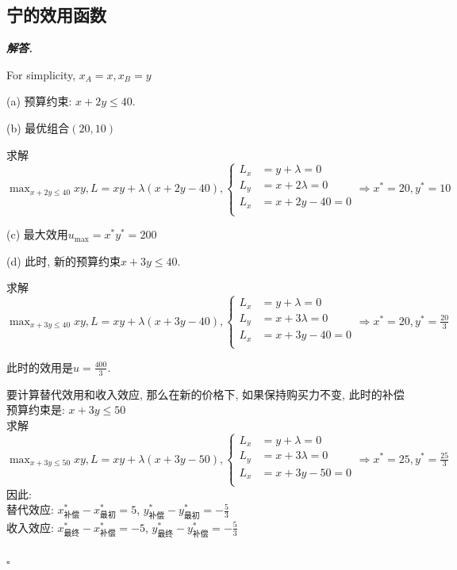 \documentclass[10pt, a4paper, oneside]{ctexart}
\newenvironment{solution}{%
  \par\noindent\textbf{\textit{解答. }}\ignorespaces
}{%
  \hfill\ensuremath{\square}\par %
}
\begin{document}
\subsection{宁的效用函数}
\begin{solution}
For simplicity, $x_A=x, x_B=y$

(a) 预算约束: $x+2y\leq 40$.

(b) 最优组合$(20,10)$

求解$\max_{x+2y\leq 40}xy, L=xy+\lambda(x+2y-40), \begin{cases}
    L_{x}&=y+\lambda=0\\
    L_{y}&=x+2\lambda=0\\
    L_{x}&=x+2y-40=0\\
\end{cases}\Rightarrow x^*=20,y^*=10$

(c) 最大效用$u_{\max}=x^*y^*=200$

(d) 此时, 新的预算约束$x+3y\leq 40$.

求解$\max_{x+3y\leq 40}xy, L=xy+\lambda(x+3y-40), \begin{cases}
    L_{x}&=y+\lambda=0\\
    L_{y}&=x+3\lambda=0\\
    L_{x}&=x+3y-40=0\\
\end{cases}\Rightarrow x^*=20,y^*=\frac{20}{3}$

此时的效用是$u=\frac{400}{3}$.

要计算替代效用和收入效应, 那么在新的价格下, 如果保持购买力不变, 此时的补偿预算约束是: $x+3y\leq 50$\\
求解$\max_{x+3y\leq 50}xy, L=xy+\lambda(x+3y-50), \begin{cases}
  L_{x}&=y+\lambda=0\\
  L_{y}&=x+3\lambda=0\\
  L_{x}&=x+3y-50=0\\
\end{cases}\Rightarrow x^*=25,y^*=\frac{25}{3}$\\
因此:\\
替代效应: $x_{\text{补偿}}^*-x_{\text{最初}}^*=5$, $y_{\text{补偿}}^*-y_{\text{最初}}^*=-\frac{5}{3}$\\
收入效应: $x_{\text{最终}}^*-x_{\text{补偿}}^*=-5$, $y_{\text{最终}}^*-y_{\text{补偿}}^*=-\frac{5}{3}$

\subsection{}

\end{solution}
\end{document}
